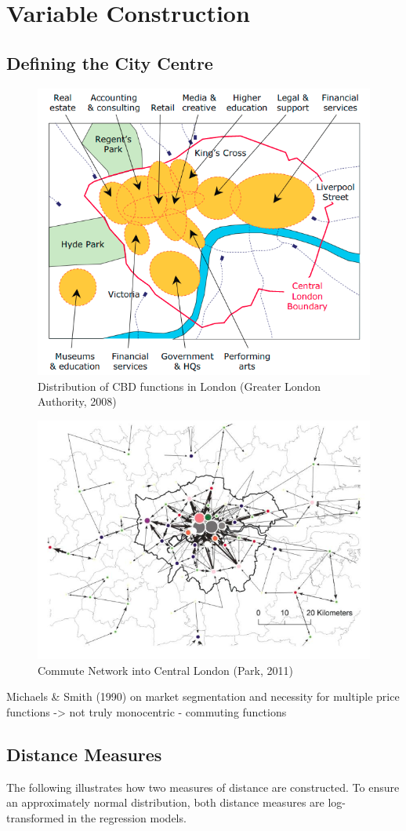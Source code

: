 \documentclass{article}
\begin{document}
\section{Variable Construction} \label{section:variables}
\subsection{Defining the City Centre}\label{subsection:CBD}
\begin{figure}[H]
  \centering
  \includegraphics[width=0.5\linewidth]{images/cbd.png}
  \caption{Distribution of CBD functions in London (Greater London Authority, 2008)}
  \label{fig:cbd}
\end{figure}

\begin{figure}[H]
  \centering
  \includegraphics[width=0.5\linewidth]{images/park2011.png}
  \caption{Commute Network into Central London (Park, 2011)}
  \label{fig:cbd}
\end{figure}


Michaels \& Smith (1990) on market segmentation and necessity for multiple price functions -> not truly monocentric - commuting functions


\subsection{Distance Measures}
The following illustrates how two measures of distance are constructed. To ensure an approximately normal distribution, both distance measures are log-transformed in the regression models.
\end{document}
